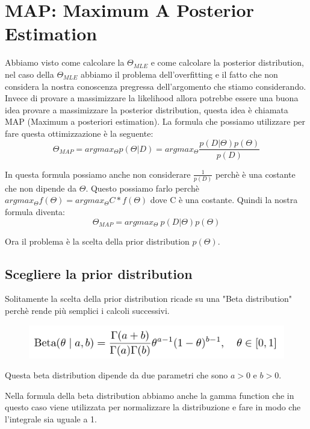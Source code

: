 \documentclass[14pt]{extreport}
\begin{document}
\section{MAP: Maximum A Posterior Estimation}

Abbiamo visto come calcolare la $\Theta_{MLE}$ e come calcolare la posterior distribution, nel caso della $\Theta_{MLE}$ abbiamo il problema
dell'overfitting e il fatto che non considera la nostra conoscenza pregressa dell'argomento che stiamo considerando. Invece di provare a massimizzare
la likelihood allora potrebbe essere una buona idea provare a massimizzare la posterior distribution, questa idea è chiamata MAP (Maximum a posteriori
estimation). La formula che possiamo utilizzare per fare questa ottimizzazione è la seguente:
\begin{equation}
	\Theta_{MAP} = argmax_{\Theta} p(\Theta | D) = argmax_{\Theta} \frac{p(D|\Theta)p(\Theta)}{p(D)}
\end{equation}

In questa formula possiamo anche non considerare $\frac{1}{p(D)}$ perchè è una costante che non dipende da $\Theta$. Questo possiamo farlo perchè
$argmax_{\Theta} f(\Theta) = argmax_{\Theta} C *f(\Theta)$ dove C è una costante. Quindi la nostra formula diventa:
\begin{equation}
	\Theta_{MAP} = argmax_{\Theta} \ p(D|\Theta)p(\Theta)
\end{equation}

Ora il problema è la scelta della prior distribution $p(\Theta)$.

\subsection{Scegliere la prior distribution}

Solitamente la scelta della prior distribution ricade su una "Beta distribution" perchè rende più semplici i calcoli successivi.
\begin{figure}[H]
	\centering
	\includegraphics[width=0.7\linewidth]{34.jpeg}
\end{figure}

Questa beta distribution dipende da due parametri che sono $a>0$ e $b>0$.

Nella formula della beta distribution abbiamo anche la gamma function che in questo caso viene utilizzata per normalizzare la distribuzione e fare in
modo che l'integrale sia uguale a 1.
\end{document}
